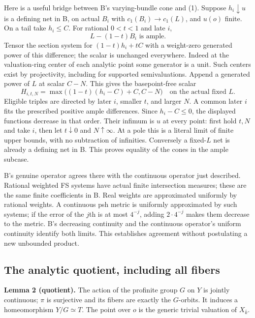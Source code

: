 \documentclass[
  11pt,
]{article}
\begin{document}
Here is a useful bridge between B's varying-bundle cone and (1). Suppose
\(h_i\downarrow u\) is a defining net in B, on actual \(B_i\) with
\(c_1(B_i)\to c_1(L)\), and \(u(o)\) finite. On a tail take
\(h_i\leq C\). For rational \(0<t<1\) and late \(i\), \[
 L-(1-t)B_i\text{ is ample}.
\] Tensor the section system for \((1-t)h_i+tC\) with a weight-zero
generated power of this difference; the scalar is unchanged everywhere.
Indeed at the valuation-ring center of each analytic point some
generator is a unit. Such centers exist by projectivity, including for
supported semivaluations. Append a generated power of \(L\) at scalar
\(C-N\). This gives the basepoint-free scalar \[
 H_{i,t,N}=\max\bigl((1-t)(h_i-C)+C,C-N\bigr)
 \quad\text{on the actual fixed }L.
 \tag{5}
\] Eligible triples are directed by later \(i\), smaller \(t\), and
larger \(N\). A common later \(i\) fits the prescribed positive ample
differences. Since \(h_i-C\leq0\), the displayed functions decrease in
that order. Their infimum is \(u\) at every point: first hold \(t,N\)
and take \(i\), then let \(t\downarrow0\) and \(N\uparrow\infty\). At a
pole this is a literal limit of finite upper bounds, with no subtraction
of infinities. Conversely a fixed-\(L\) net is already a defining net in
B. This proves equality of the cones in the ample subcase.

B's genuine operator agrees there with the continuous operator just
described. Rational weighted FS systems have actual finite intersection
measures; these are the same finite coefficients in B. Real weights are
approximated uniformly by rational weights. A continuous psh metric is
uniformly approximated by such systems; if the error of the \(j\)th is
at most \(4^{-j}\), adding \(2\cdot4^{-j}\) makes them decrease to the
metric. B's decreasing continuity and the continuous operator's uniform
continuity identify both limits. This establishes agreement without
postulating a new unbounded product.

\subsection{The analytic quotient, including all
fibers}\label{the-analytic-quotient-including-all-fibers}

\textbf{Lemma 2 (quotient).} The action of the profinite group \(G\) on
\(Y\) is jointly continuous; \(\pi\) is surjective and its fibers are
exactly the \(G\)-orbits. It induces a homeomorphism \(Y/G\simeq T\).
The point over \(o\) is the generic trivial valuation of \(X_{\bar k}\).
\end{document}
